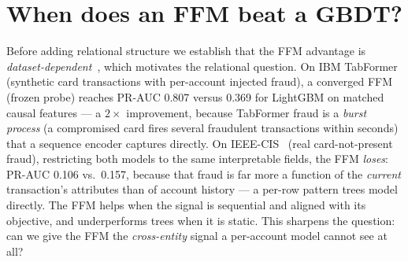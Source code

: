 \section{When does an FFM beat a GBDT?}
\label{sec:ffmvsgbdt}

Before adding relational structure we establish that the FFM advantage is
\emph{dataset-dependent}~\cite{gorishniy2021revisiting}, which motivates the relational question.
On IBM TabFormer~\cite{padhi2021tabular} (synthetic
card transactions with per-account injected fraud), a converged FFM (frozen probe) reaches
PR-AUC \num{0.807} versus \num{0.369} for LightGBM on matched causal features --- a $2\times$
improvement, because TabFormer fraud is a \emph{burst process} (a compromised card fires several
fraudulent transactions within seconds) that a sequence encoder captures directly. On
IEEE-CIS~\cite{ieeecis2019}
(real card-not-present fraud), restricting both models to the same interpretable fields, the FFM
\emph{loses}: PR-AUC \num{0.106} vs.\ \num{0.157}, because that fraud is far more a function of the
\emph{current} transaction's attributes than of account history --- a per-row pattern trees model
directly. The FFM helps when the signal is sequential and aligned with its objective, and
underperforms trees when it is static. This sharpens the question: can we give the FFM the
\emph{cross-entity} signal a per-account model cannot see at all?
